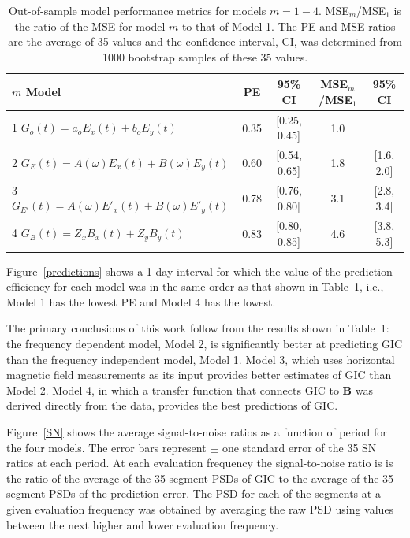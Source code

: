 \documentclass[draft,linenumbers]{agujournal2018}
\begin{document}
\begin{table}
\caption{Out-of-sample model performance metrics for models $m=1-4$. MSE$_m$/MSE$_1$ is the ratio of the MSE for model $m$ to that of Model 1. The PE and MSE ratios are the average of 35 values and the confidence interval, CI, was determined from 1000 bootstrap samples of these 35 values.}
\centering
\begin{tabular}{l c c c c}
\hline
$m$\hspace{1em} Model & PE & 95\% CI & MSE$_m$/MSE$_1$ & 95\% CI\\
\hline
1\hspace{1em} $G_o(t) = a_oE_x(t) + b_oE_y(t)$ & 0.35 & [0.25, 0.45] & 1.0 & \\
2\hspace{1em} $G_E(t) = A(\omega)E_x(t) + B(\omega)E_y(t)$ & 0.60 & [0.54, 0.65] & 1.8 & [1.6, 2.0]\\
3\hspace{1em} $G_{E'}(t) = A(\omega)E'_x(t) + B(\omega)E'_y(t)$ & 0.78 & [0.76, 0.80] & 3.1 & [2.8, 3.4]\\
4\hspace{1em} $G_{B}(t) = Z_xB_x(t) + Z_yB_y(t)$ & 0.83 & [0.80, 0.85] & 4.6 & [3.8, 5.3]\\
\hline
\end{tabular}
\end{table}

Figure~\ref{predictions} shows a 1-day interval for which the value of the prediction efficiency for each model was in the same order as that shown in Table~1, i.e., Model 1 has the lowest PE and Model 4 has the lowest.

The primary conclusions of this work follow from the results shown in Table~1: the frequency dependent model, Model 2, is significantly better at predicting GIC than the frequency independent model, Model 1. Model 3, which uses horizontal magnetic field measurements as its input provides better estimates of GIC than Model 2. Model 4, in which a transfer function that connects GIC to $\mathbf{B}$ was derived directly from the data, provides the best predictions of GIC. 

Figure~\ref{SN} shows the average signal-to-noise ratios as a function of period for the four models. The error bars represent $\pm$ one standard error of the 35 SN ratios at each period. At each evaluation frequency the signal-to-noise ratio is is the ratio of the average of the 35 segment PSDs of GIC to the average of the 35 segment PSDs of the prediction error. The PSD for each of the segments at a given evaluation frequency was obtained by averaging the raw PSD using values between the next higher and lower evaluation frequency. 
\end{document}
